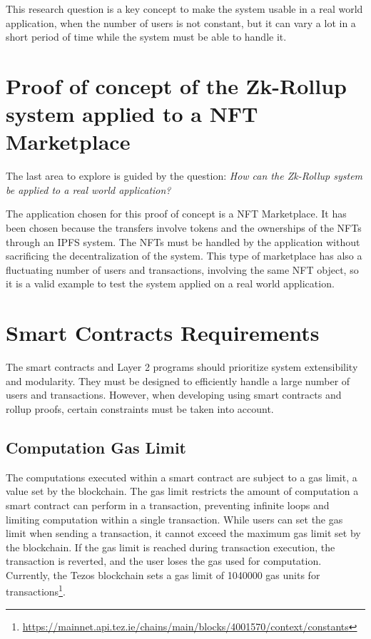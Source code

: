 This research question is a key concept to make the system usable in a real world application, when the number of users is not constant, but it can vary a lot in a short period of time while the system must be able to handle it.

\section{Proof of concept of the Zk-Rollup system applied to a NFT Marketplace}
The last area to explore is guided by the question: \textit{How can the Zk-Rollup system be applied to a real world application?}

The application chosen for this proof of concept is a NFT Marketplace. It has been chosen because the transfers involve tokens and the ownerships of the NFTs through an IPFS system. The NFTs must be handled by the application without sacrificing the decentralization of the system. This type of marketplace has also a fluctuating number of users and transactions, involving the same NFT object, so it is a valid example to test the system applied on a real world application.

\section{Smart Contracts Requirements \label{sec:3_smartContractsRequirements}}

The smart contracts and Layer 2 programs should prioritize system extensibility and modularity. They must be designed to efficiently handle a large number of users and transactions. However, when developing using smart contracts and rollup proofs, certain constraints must be taken into account.

\subsection{Computation Gas Limit \label{subsec:gasLimit}}

The computations executed within a smart contract are subject to a gas limit, a value set by the blockchain. The gas limit restricts the amount of computation a smart contract can perform in a transaction, preventing infinite loops and limiting computation within a single transaction. While users can set the gas limit when sending a transaction, it cannot exceed the maximum gas limit set by the blockchain. If the gas limit is reached during transaction execution, the transaction is reverted, and the user loses the gas used for computation. Currently, the Tezos blockchain sets a gas limit of 1040000 gas units for transactions\footnote{\url{https://mainnet.api.tez.ie/chains/main/blocks/4001570/context/constants}}.

